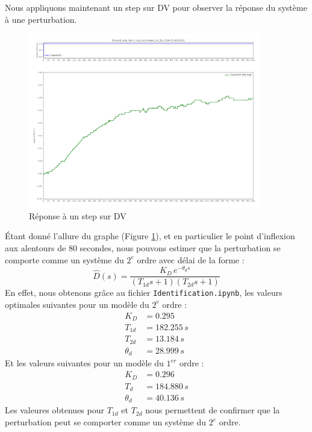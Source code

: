 \documentclass{article}
\begin{document}
Nous appliquons maintenant un step sur DV pour observer la réponse du système à une perturbation.
\begin{figure}[H]
    \centering
    \includegraphics[width=0.9\textwidth]{../Plots/Graphical_methods_Cleaned_data_Open_loop_experiment_on_DV_2024-03-18-20h01.png}
    \caption{Réponse à un step sur DV}
    \label{fig:DV_step_response}
\end{figure}

Étant donné l'allure du graphe (Figure \ref{fig:DV_step_response}), et en particulier le point d'inflexion aux alentours de 80 secondes, nous pouvons estimer que la perturbation se comporte comme un système du $2^{e}$ ordre avec délai de la forme :
\begin{equation}
    \hat{D}(s) = \frac{K_D\,e^{-\theta_d s}}{(T_{1d}s + 1)(T_{2d}s + 1)}
\end{equation}
En effet, nous obtenons grâce au fichier \texttt{Identification.ipynb}, les valeurs optimales suivantes pour un modèle du $2^{e}$ ordre :
\begin{align*}
    K_D &= 0.295 \\
    T_{1d} &= 182.255 \,s \\
    T_{2d} &= 13.184 \,s \\
    \theta_d &= 28.999 \,s
\end{align*}
Et les valeurs suivantes pour un modèle du $1^{er}$ ordre :
\begin{align*}
    K_D &= 0.296 \\
    T_{d} &= 184.880 \,s \\
    \theta_d &= 40.136 \,s
\end{align*}
Les valeures obtenues pour $T_{1d}$ et $T_{2d}$ nous permettent de confirmer que la perturbation peut se comporter comme un système du $2^{e}$ ordre.
\end{document}
